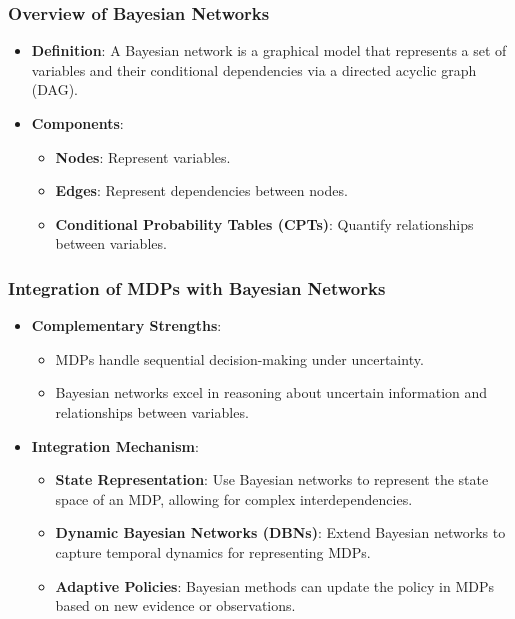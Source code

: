 \documentclass[aspectratio=169]{beamer}
\begin{document}
\begin{frame}[fragile]
    \frametitle{Overview of Bayesian Networks}
    
    \begin{itemize}
        \item \textbf{Definition}: A Bayesian network is a graphical model that represents a set of variables and their conditional dependencies via a directed acyclic graph (DAG).
        \item \textbf{Components}:
        \begin{itemize}
            \item \textbf{Nodes}: Represent variables.
            \item \textbf{Edges}: Represent dependencies between nodes.
            \item \textbf{Conditional Probability Tables (CPTs)}: Quantify relationships between variables.
        \end{itemize}
    \end{itemize}
\end{frame}

\begin{frame}[fragile]
    \frametitle{Integration of MDPs with Bayesian Networks}
    
    \begin{itemize}
        \item \textbf{Complementary Strengths}:
        \begin{itemize}
            \item MDPs handle sequential decision-making under uncertainty.
            \item Bayesian networks excel in reasoning about uncertain information and relationships between variables.
        \end{itemize}
        
        \item \textbf{Integration Mechanism}:
        \begin{itemize}
            \item \textbf{State Representation}: Use Bayesian networks to represent the state space of an MDP, allowing for complex interdependencies.
            \item \textbf{Dynamic Bayesian Networks (DBNs)}: Extend Bayesian networks to capture temporal dynamics for representing MDPs.
            \item \textbf{Adaptive Policies}: Bayesian methods can update the policy in MDPs based on new evidence or observations.
        \end{itemize}
    \end{itemize}
\end{frame}
\end{document}
